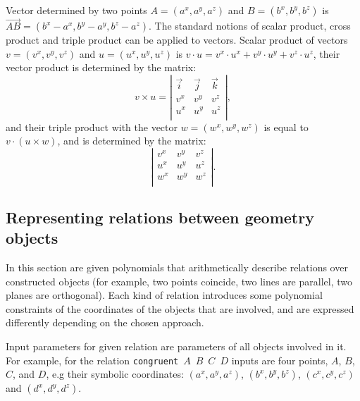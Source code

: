 \documentclass{aicom2e}
\begin{document}
Vector determined by two points $A = (a^x, a^y, a^z)$ and
$B = (b^x, b^y, b^z)$ is
$\overrightarrow{AB} = (b^x- a^x, b^y - a^y, b^z - a^z)$. The standard
notions of scalar product, cross product and triple product can be
applied to vectors. Scalar product of vectors $v = (v^x, v^y, v^z)$
and $u = (u^x, u^y, u^z)$ is
$v\cdot u = v^x\cdot u^x+ v^y\cdot u^y + v^z\cdot u^z$, their vector
product is determined by the matrix:
$$ v\times u = \left|\begin{array}{ccc} \overrightarrow{i} & \overrightarrow{j} & \overrightarrow{k} \\ 
                       v^x& v^y & v^z \\
                       u^x& u^y & u^z \\
\end{array}\right|,$$
and their triple product with the vector $w = (w^x, w^y, w^z)$ is
equal to $v\cdot (u \times w)$, and is determined by the matrix:
$$\left|\begin{array}{ccc} v^x& v^y & v^z \\ u^x& u^y
  & u^z \\ w^x& w^y & w^z \\
\end{array}\right|.$$


\subsection{Representing relations between geometry objects}
In this section are given polynomials that arithmetically describe
relations over constructed objects (for example, two points coincide,
two lines are parallel, two planes are orthogonal).  Each kind of
relation introduces some polynomial constraints of the coordinates of
the objects that are involved, and are expressed differently depending
on the chosen approach.

Input parameters for given relation are parameters of all objects
involved in it. For example, for the relation \mbox{{\tt congruent}
  $A$ $B$ $C$ $D$} inputs are four points, $A$, $B$, $C$, and $D$, e.g
their symbolic coordinates: $(a^x, a^y, a^z)$, $(b^x, b^y, b^z)$,
$(c^x, c^y, c^z)$ and $(d^x, d^y, d^z)$.
\end{document}
